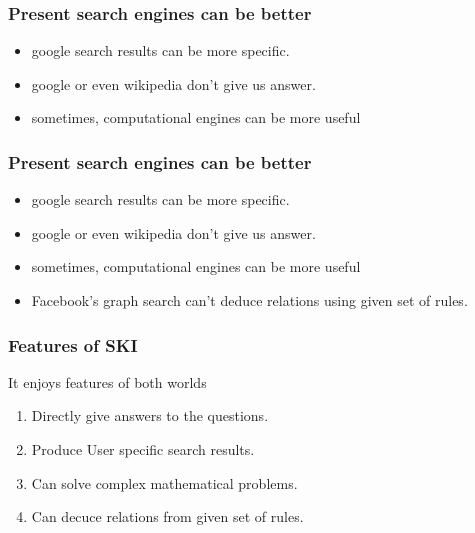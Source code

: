 \documentclass{beamer}
\begin{document}
\begin{frame}
  \frametitle{Present search engines can be better}
 \begin{itemize}
  \item google search results can be more specific.
    \item google or even wikipedia don't give us answer.
    \pause
  \item sometimes, computational engines can be more useful

 \end{itemize}
\end{frame}



\begin{frame}
   \frametitle{Present search engines can be better}
 \begin{itemize}
  \item google search results can be more specific.
   \item google or even wikipedia don't give us answer.
  \item sometimes, computational engines can be more useful

  \pause
  \item Facebook's graph search can't deduce relations using given set of rules.
 \end{itemize}
\end{frame}

\begin{frame}
 \frametitle{Features of SKI}
 \begin{block}{It enjoys features of both worlds}
 \begin{enumerate}
  \item Directly give answers to the questions.
  \pause
  \item Produce User specific search results.
  \pause
  \item Can solve complex mathematical problems.
  \pause
  \item Can decuce relations from given set of rules.
 \end{enumerate}
 \end{block}
\end{frame}
\end{document}
